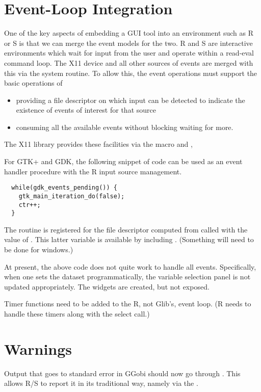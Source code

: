 \documentclass{article}
\def\CPPMacro#1{\CPP{#1}}
\begin{document}
\section{Event-Loop Integration}
One of the key aspects of embedding a GUI tool into an environment
such as R or S is that we can merge the event models for the two.  R
and S are interactive environments which wait for input from the user
and operate within a read-eval command loop.  The X11 device and all
other sources of events are merged with this via the system
 routine. To allow this, the event operations must
support the basic operations of 
\begin{itemize}
\item providing a file descriptor on which input can be detected
to indicate the existence of events of interest for that 
source
\item consuming all the available events without blocking
waiting for more.
\end{itemize}
The X11 library provides these facilities via
the \CPPMacro{ConnectionNumber} macro
and ,

For GTK+ and GDK, the following snippet of code
can be used as an event handler procedure with
the R input source management.
\begin{verbatim}
  while(gdk_events_pending()) {
    gtk_main_iteration_do(false);
    ctr++;
  }
\end{verbatim}
The routine is registered for the file descriptor computed from
\CPPMacro{ConnectionNumber} called with the value of
. This latter variable is available by
including . ({\red Something will need to be done for
windows.})


At present, the above code does not quite work to handle all events.
Specifically, when one sets the dataset programmatically,
the variable selection panel is not updated appropriately.
The widgets are created, but not exposed.


Timer functions need to be added to the R, not Glib's, event loop.  (R
needs to handle these timers along with the select call.)


\section{Warnings}
Output that goes to standard error in GGobi should now go through
.  This allows R/S to report it in its
traditional way, namely via the .
\end{document}
